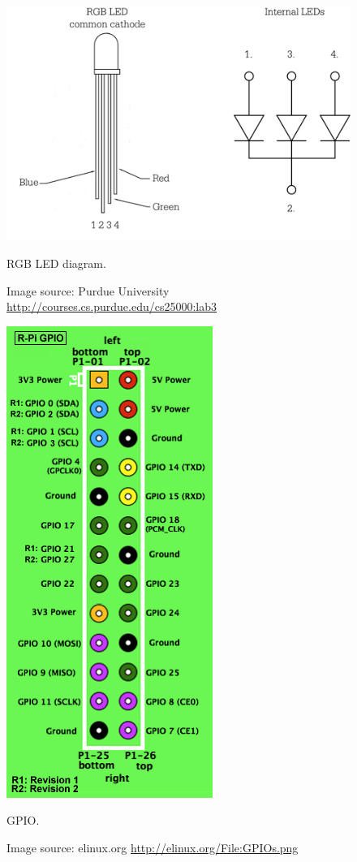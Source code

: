 \begin{figure}
	\begin{minipage}[t]{0.4\linewidth}
		\centering
			\includegraphics[width=0.30\paperwidth]{Pictures/rgb_led_diagram.jpg}
		\caption{RGB LED diagram.}
		\caption*{Image source: Purdue University \url{http://courses.cs.purdue.edu/cs25000:lab3}}
		\label{fig:rgb-led}
	\end{minipage}
	\hspace{1cm}
	\begin{minipage}[t]{0.4\linewidth}
		\centering
			\includegraphics[width=0.20\paperwidth]{Pictures/GPIOs.png}
		\caption{\rpi{} GPIO.}
		\caption*{Image source: elinux.org \url{http://elinux.org/File:GPIOs.png}}
		\label{fig:rpigpio}
	\end{minipage}
\end{figure}


